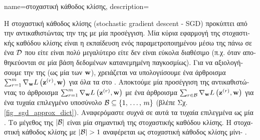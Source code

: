 {name={\foreignlanguage{greek}{στοχαστική κάθοδος κλίσης}}, 
	description={\foreignlanguage{greek}{Η στοχαστική κάθοδος κλίσης} 
		(stochastic gradient descent - SGD) \foreignlanguage{greek}{προκύπτει από την}  
		\foreignlanguage{greek}{αντικαθιστώντας την}  \foreignlanguage{greek}{της}  
		\foreignlanguage{greek}{με μία}  \foreignlanguage{greek}{προσέγγιση. Μία κύρια εφαρμογή της
		στοχαστικής καθόδου κλίσης είναι η εκπαίδευση ενός παραμετροποιημένου}  \foreignlanguage{greek}{μέσω
		της}  \foreignlanguage{greek}{πάνω σε ένα}  $\mathcal{D}$ \foreignlanguage{greek}{που  
		είτε είναι πολύ μεγαλύτερο είτε δεν είναι εύκολα διαθέσιμο (π.χ. όταν}  \foreignlanguage{greek}{αποθηκεύονται 
		σε μία βάση δεδομένων κατανεμημένη παγκοσμίως). Για να αξιολογήσουμε την}  
		\foreignlanguage{greek}{της}  (\foreignlanguage{greek}{ως μία}  \foreignlanguage{greek}{των} 
		 ${\bf w}$), \foreignlanguage{greek}{χρειάζεται να υπολογιίσουμε ένα άρθροισμα
		$\sum_{r=1}^{m} \nabla_{{\bf w}} L\left({\bf z}^{(r)},{\bf w} \right)$ για όλα τα}  
		\foreignlanguage{greek}{στο} . \foreignlanguage{greek}{Αποκτούμε μία}  
		\foreignlanguage{greek}{προσέγγιση της}  \foreignlanguage{greek}{αντικαθιστώντας το άρθροισμα  
		$\sum_{r=1}^{m} \nabla_{{\bf w}} L\left({\bf z}^{(r)},{\bf w} \right)$ 
		με ένα άρθροισμα $\sum_{r \in \mathcal{B}} \nabla_{{\bf w}} L\left({\bf z}^{(r)},{\bf w} \right)$ 
		για ένα τυχαία επιλεγμένο υποσύνολο $\mathcal{B} \subseteq \{1, \,\ldots, \,m\}$ (βλέπε Σχ.} \ref{fig_sgd_approx_dict}). 
		\foreignlanguage{greek}{Αναφερόμαστε συχνά σε αυτά τα τυχαία επιλεγμένα}  \foreignlanguage{greek}{ως 
		μία} . \foreignlanguage{greek}{Το μέγεθος της}  $|\mathcal{B}|$ \foreignlanguage{greek}{είναι μία 
		σημαντική}  \foreignlanguage{greek}{της στοχαστικής καθόδου κλίσης. Η στοχαστική κάθοδος κλίσης  
		με $|\batch|> 1$ αναφέρεται ως στοχαστική κάθοδος κλίσης μίνι}- \cite{Bottou99}. 		
		\begin{figure}[H]

\end{figure}}}
